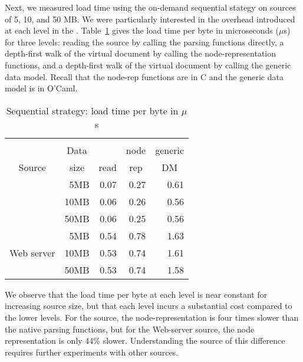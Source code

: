 Next, we measured load time using the on-demand sequential stategy on
sources of 5, 10, and 50 MB.  We were particularly interested in the
overhead introduced at each level in the \condm{}.
Table~\ref{tab:linear} gives the load time per byte in microseconds
($\mu$s) for three levels: reading the source by calling the \pads{}
parsing functions directly, a depth-first walk of the virtual \Xml{}
document by calling the \padx{} node-representation functions, and a
depth-first walk of the virtual \Xml{} document by calling the \padx{}
generic data model.  Recall that the node-rep functions are in C and
the generic data model is in O'Caml.
\begin{table}
\begin{center}
\begin{tabular}{c|r|r|r|r}
           &         &           &  \multicolumn{1}{c|}{\padx{}}   &  \multicolumn{1}{c}{\padx{}} \\
           & \multicolumn{1}{c|}{Data}  & \multicolumn{1}{c|}{\pads{}} & \multicolumn{1}{c|}{node}&  \multicolumn{1}{c}{generic} \\
Source     & \multicolumn{1}{c|}{size}  &  \multicolumn{1}{c|}{read}   & \multicolumn{1}{c|}{rep} &  \multicolumn{1}{c}{DM}  \\ \hline
           &  5MB  & 0.07    &  0.27  & 0.61 \\ %
\dibbler{} & 10MB  & 0.06    &  0.26  & 0.56 \\
           & 50MB  & 0.06    &  0.25  & 0.56 \\ \hline
           &  5MB  & 0.54    &  0.78  & 1.63 \\ %
Web server & 10MB  & 0.53    &  0.74  & 1.61 \\
           & 50MB  & 0.53    &  0.74  & 1.58 \\ 
\end{tabular}
\end{center}
\caption{Sequential strategy: load time per byte in $\mu$s}
\label{tab:linear}
\end{table}

We observe that the load time per byte at each level is near constant for
increasing source size, but that each level incurs a substantial cost
compared to the lower levels.  For the \dibbler{} source, the \padx{}
node-representation is four times slower than the native \pads{}
parsing functions, but for the Web-server source, the \padx{} node
representation is only 44\% slower.  Understanding the source of this
difference requires further experiments with other sources.

